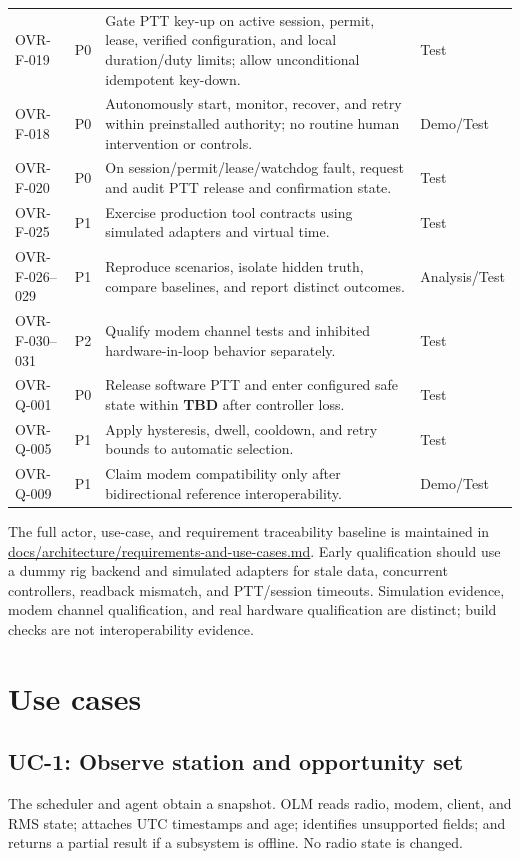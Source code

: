 \documentclass[11pt,a4paper]{article}
\newcommand{\todo}{\textcolor{ovred}{\textbf{TBD}}}
\begin{document}
\begin{landscape}
\begin{longtable}{@{}p{0.95in}p{0.55in}p{4.65in}p{1.0in}@{}}
OVR-F-019 & P0 & Gate PTT key-up on active session, permit, lease, verified configuration, and local duration/duty limits; allow unconditional idempotent key-down. & Test \\
OVR-F-018 & P0 & Autonomously start, monitor, recover, and retry within preinstalled authority; no routine human intervention or controls. & Demo/Test \\
OVR-F-020 & P0 & On session/permit/lease/watchdog fault, request and audit PTT release and confirmation state. & Test \\
OVR-F-025 & P1 & Exercise production tool contracts using simulated adapters and virtual time. & Test \\
OVR-F-026--029 & P1 & Reproduce scenarios, isolate hidden truth, compare baselines, and report distinct outcomes. & Analysis/Test \\
OVR-F-030--031 & P2 & Qualify modem channel tests and inhibited hardware-in-loop behavior separately. & Test \\
OVR-Q-001 & P0 & Release software PTT and enter configured safe state within \todo{} after controller loss. & Test \\
OVR-Q-005 & P1 & Apply hysteresis, dwell, cooldown, and retry bounds to automatic selection. & Test \\
OVR-Q-009 & P1 & Claim modem compatibility only after bidirectional reference interoperability. & Demo/Test \\
\bottomrule
\end{longtable}
\end{landscape}
\clearpage

The full actor, use-case, and requirement traceability baseline is maintained in \url{docs/architecture/requirements-and-use-cases.md}. Early qualification should use a dummy rig backend and simulated adapters for stale data, concurrent controllers, readback mismatch, and PTT/session timeouts. Simulation evidence, modem channel qualification, and real hardware qualification are distinct; build checks are not interoperability evidence.


\section{Use cases}

\subsection{UC-1: Observe station and opportunity set}
The scheduler and agent obtain a snapshot. OLM reads radio, modem, client, and RMS state; attaches UTC timestamps and age; identifies unsupported fields; and returns a partial result if a subsystem is offline. No radio state is changed.
\end{document}
